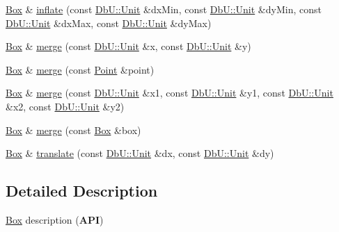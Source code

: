 \begin{DoxyCompactItemize}
\item 
\hyperlink{classHurricane_1_1Box}{Box} \& \hyperlink{classHurricane_1_1Box_afd1baf9f272878a87c2525f0fa2eab71}{inflate} (const \hyperlink{group__DbUGroup_ga4fbfa3e8c89347af76c9628ea06c4146}{Db\+U\+::\+Unit} \&dx\+Min, const \hyperlink{group__DbUGroup_ga4fbfa3e8c89347af76c9628ea06c4146}{Db\+U\+::\+Unit} \&dy\+Min, const \hyperlink{group__DbUGroup_ga4fbfa3e8c89347af76c9628ea06c4146}{Db\+U\+::\+Unit} \&dx\+Max, const \hyperlink{group__DbUGroup_ga4fbfa3e8c89347af76c9628ea06c4146}{Db\+U\+::\+Unit} \&dy\+Max)
\item 
\hyperlink{classHurricane_1_1Box}{Box} \& \hyperlink{classHurricane_1_1Box_ab77fe56f9350f06cc872bbb4f83835da}{merge} (const \hyperlink{group__DbUGroup_ga4fbfa3e8c89347af76c9628ea06c4146}{Db\+U\+::\+Unit} \&x, const \hyperlink{group__DbUGroup_ga4fbfa3e8c89347af76c9628ea06c4146}{Db\+U\+::\+Unit} \&y)
\item 
\hyperlink{classHurricane_1_1Box}{Box} \& \hyperlink{classHurricane_1_1Box_af1f7dfe8984c2d26fbca78b21358ee2b}{merge} (const \hyperlink{classHurricane_1_1Point}{Point} \&point)
\item 
\hyperlink{classHurricane_1_1Box}{Box} \& \hyperlink{classHurricane_1_1Box_ad97e73e91dd36404eb0dde9d44ff2fd7}{merge} (const \hyperlink{group__DbUGroup_ga4fbfa3e8c89347af76c9628ea06c4146}{Db\+U\+::\+Unit} \&x1, const \hyperlink{group__DbUGroup_ga4fbfa3e8c89347af76c9628ea06c4146}{Db\+U\+::\+Unit} \&y1, const \hyperlink{group__DbUGroup_ga4fbfa3e8c89347af76c9628ea06c4146}{Db\+U\+::\+Unit} \&x2, const \hyperlink{group__DbUGroup_ga4fbfa3e8c89347af76c9628ea06c4146}{Db\+U\+::\+Unit} \&y2)
\item 
\hyperlink{classHurricane_1_1Box}{Box} \& \hyperlink{classHurricane_1_1Box_a0bdfa52a3f5f6639680ba7dbc52c21d7}{merge} (const \hyperlink{classHurricane_1_1Box}{Box} \&box)
\item 
\hyperlink{classHurricane_1_1Box}{Box} \& \hyperlink{classHurricane_1_1Box_aa689be4b37c83412f3dc95fc23c82156}{translate} (const \hyperlink{group__DbUGroup_ga4fbfa3e8c89347af76c9628ea06c4146}{Db\+U\+::\+Unit} \&dx, const \hyperlink{group__DbUGroup_ga4fbfa3e8c89347af76c9628ea06c4146}{Db\+U\+::\+Unit} \&dy)
\end{DoxyCompactItemize}


\subsection{Detailed Description}
\hyperlink{classHurricane_1_1Box}{Box} description ({\bfseries A\+PI}) 

